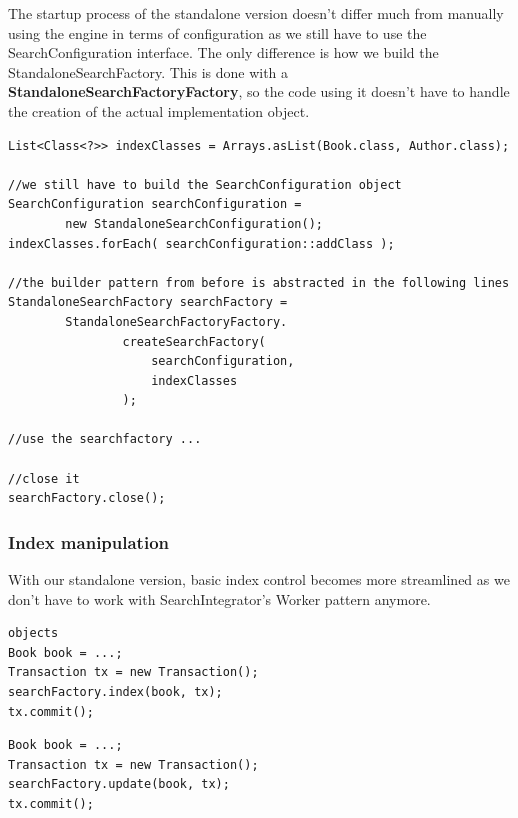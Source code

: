 The startup process of the standalone version doesn't differ much from manually using the engine in terms of configuration as we still have to use the SearchConfiguration interface. The only difference is how we build the StandaloneSearchFactory. This is done with a \textbf{StandaloneSearchFactoryFactory}, so the code using it doesn't have to handle the creation of the actual implementation object.
\\
\lstset{language=java}
\begin{lstlisting}[frame=htrbl, caption={Starting up the standalone version}, label={lst:using_standalone.java}]
List<Class<?>> indexClasses = Arrays.asList(Book.class, Author.class);

//we still have to build the SearchConfiguration object
SearchConfiguration searchConfiguration = 
		new StandaloneSearchConfiguration();
indexClasses.forEach( searchConfiguration::addClass );

//the builder pattern from before is abstracted in the following lines
StandaloneSearchFactory searchFactory = 
		StandaloneSearchFactoryFactory.
				createSearchFactory(
					searchConfiguration,
					indexClasses
				);
				
//use the searchfactory ...

//close it
searchFactory.close();
\end{lstlisting}

\pagebreak

\subsubsection{Index manipulation}

With our standalone version, basic index control becomes more streamlined as we don't have to work with  SearchIntegrator's Worker pattern anymore.
\\
\lstset{language=java}
\begin{lstlisting}[frame=htrbl, caption={Indexing an object with the standalone version}, label={lst:indexing_object_native.java}]objects
Book book = ...;
Transaction tx = new Transaction();
searchFactory.index(book, tx);
tx.commit();
\end{lstlisting}

\lstset{language=java}
\begin{lstlisting}[frame=htrbl, caption={Updating an object with the standalone version}, label={lst:updating_object_native.java}]
Book book = ...;
Transaction tx = new Transaction();
searchFactory.update(book, tx);
tx.commit();
\end{lstlisting}


